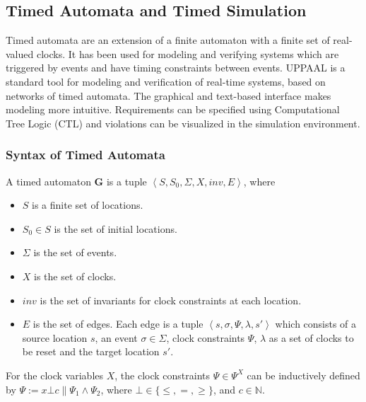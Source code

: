 \subsection{Timed Automata and Timed Simulation}
Timed automata \cite{timed_automata} are an extension of a finite automaton with a finite set of real-valued clocks. It has been used for modeling and verifying systems which are triggered by events and have timing constraints between events.  UPPAAL is a standard tool for modeling and verification of real-time systems, based on networks of timed automata. The graphical and text-based interface makes modeling more intuitive. Requirements can be specified using Computational Tree Logic (CTL) \cite{Clarke} and violations can be visualized in the simulation environment.
\subsubsection{Syntax of Timed Automata}
A timed automaton \textbf{G} is a tuple $\left\langle S,S_0,\Sigma,X,inv,E\right\rangle$, where

\begin{itemize}
	\item $S$ is a finite set of locations.
	\item $S_0\in S$ is the set of initial locations.
	\item $\Sigma$ is the set of events.
	\item $X$ is the set of clocks.
	\item $inv$ is the set of invariants for clock constraints at each location.
	\item $E$ is the set of edges. Each edge is a tuple $\left\langle s,\sigma,\Psi,\lambda,s'\right\rangle$ which consists of a source location $s$, an event $\sigma\in\Sigma$, clock constraints $\Psi$, $\lambda$ as a set of clocks to be reset and the target location $s'$.   
\end{itemize}

For the clock variables $X$, the clock constraints $\Psi\in\Psi^X$ can be inductively defined by $\Psi:=x\bot c\|\Psi_1\wedge\Psi_2$, where $\bot\in\{\leq,=,\geq\}$, and $c\in\mathbb{N}$.
